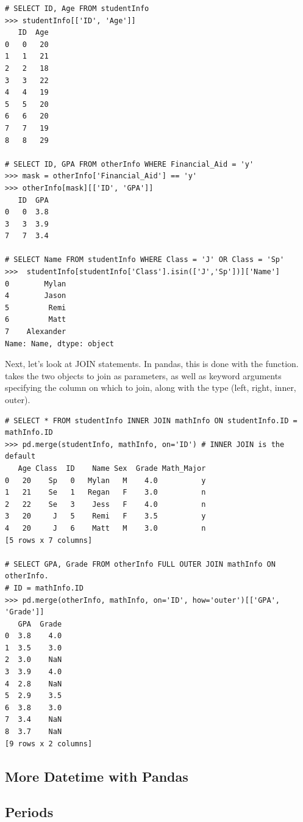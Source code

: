 \begin{lstlisting}
# SELECT ID, Age FROM studentInfo
>>> studentInfo[['ID', 'Age']]
   ID  Age
0   0   20
1   1   21
2   2   18
3   3   22
4   4   19
5   5   20
6   6   20
7   7   19
8   8   29

# SELECT ID, GPA FROM otherInfo WHERE Financial_Aid = 'y'
>>> mask = otherInfo['Financial_Aid'] == 'y'
>>> otherInfo[mask][['ID', 'GPA']]
   ID  GPA
0   0  3.8
3   3  3.9
7   7  3.4

# SELECT Name FROM studentInfo WHERE Class = 'J' OR Class = 'Sp'
>>>  studentInfo[studentInfo['Class'].isin(['J','Sp'])]['Name']
0        Mylan
4        Jason
5         Remi
6         Matt
7    Alexander
Name: Name, dtype: object
\end{lstlisting}

Next, let's look at JOIN statements.
In pandas, this is done with the  function.
 takes the two  objects to join as parameters, as well as keyword arguments specifying
the column on which to join, along with the type (left, right, inner, outer).

\begin{lstlisting}
# SELECT * FROM studentInfo INNER JOIN mathInfo ON studentInfo.ID = mathInfo.ID
>>> pd.merge(studentInfo, mathInfo, on='ID') # INNER JOIN is the default
   Age Class  ID    Name Sex  Grade Math_Major
0   20    Sp   0   Mylan   M    4.0          y
1   21    Se   1   Regan   F    3.0          n
2   22    Se   3    Jess   F    4.0          n
3   20     J   5    Remi   F    3.5          y
4   20     J   6    Matt   M    3.0          n
[5 rows x 7 columns]

# SELECT GPA, Grade FROM otherInfo FULL OUTER JOIN mathInfo ON otherInfo.
# ID = mathInfo.ID
>>> pd.merge(otherInfo, mathInfo, on='ID', how='outer')[['GPA', 'Grade']]
   GPA  Grade
0  3.8    4.0
1  3.5    3.0
2  3.0    NaN
3  3.9    4.0
4  2.8    NaN
5  2.9    3.5
6  3.8    3.0
7  3.4    NaN
8  3.7    NaN
[9 rows x 2 columns]
\end{lstlisting}

\subsection*{More Datetime with Pandas}
\subsection*{Periods} %

